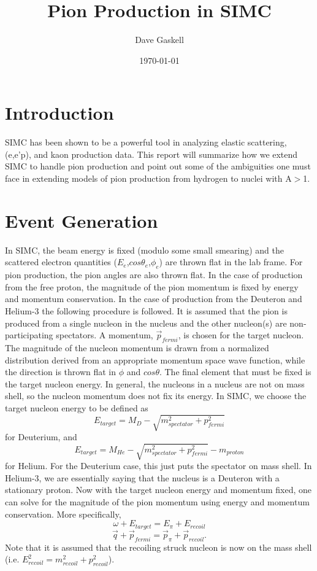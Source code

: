 
\title{Pion Production in SIMC}
\author{Dave Gaskell}
\date{\today}
\maketitle

\section{Introduction}
SIMC has been shown to be a powerful tool in analyzing elastic scattering,
(e,e'p), and kaon production data.  This report will summarize how we extend
SIMC to handle pion production and point out some of the ambiguities one must 
face in extending models of pion production from hydrogen to nuclei with A$>$1.

\section{Event Generation}
In SIMC, the beam energy is fixed (modulo some small smearing) and the 
scattered electron quantities ($E_e$,$cos{\theta_e}$,$\phi_e$) are thrown flat 
in the lab frame.  For pion production, the pion angles are also thrown flat.
In the case of production from the free proton, the magnitude of the pion 
momentum is fixed by energy and momentum conservation.  In the case of 
production from the Deuteron and Helium-3 the following procedure is followed.
It is assumed that the pion is produced from a single nucleon in the nucleus 
and the other nucleon(s) are non-participating
spectators.  A momentum, $\vec{p}_{fermi}$, is chosen for the target nucleon.  
The magnitude of the nucleon momentum is drawn from a normalized distribution
derived from an appropriate momentum space wave function, while the direction
is thrown flat in $\phi$ and $cos{\theta}$.  The final element that must be
fixed is the target nucleon energy.  In general, the nucleons in a nucleus are
not on mass shell, so the nucleon momentum does not fix its energy.  In SIMC, 
we choose the target nucleon energy to be defined as
$$
E_{target} = M_{D} - \sqrt{m_{spectator}^2+p^2_{fermi}} 
$$
for Deuterium, and
$$
E_{target} = M_{He} - \sqrt{m_{spectator}^2+p^2_{fermi}} - m_{proton}
$$
for Helium.  
For the Deuterium case, this just puts the spectator on mass shell.  In 
Helium-3, we are essentially saying that the nucleus is a Deuteron with a 
stationary proton. Now with the target nucleon energy and momentum fixed, one
can solve for the magnitude of the pion momentum using energy and momentum
conservation.  More specifically,
$$
\omega + E_{target} = E_{\pi} + E_{recoil}
$$
$$
\vec{q} + \vec{p}_{fermi} = \vec{p}_{\pi} + \vec{p}_{recoil}.
$$
Note that it is assumed that the recoiling struck nucleon is now on the mass 
shell (i.e. $E^2_{recoil}=m^2_{recoil}+p^2_{recoil}$).


